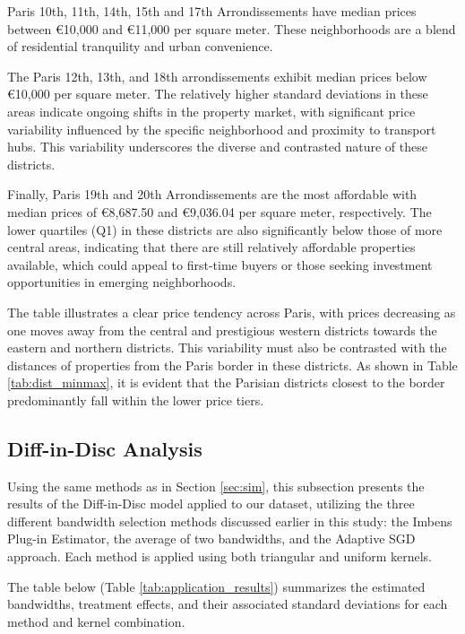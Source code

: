 \documentclass[12pt]{article}
\theoremstyle{plain}
\theoremstyle{remark}
\begin{document}
Paris 10th, 11th, 14th, 15th and 17th Arrondissements have median prices between €10,000 and €11,000 per square meter. These neighborhoods are a blend of residential tranquility and urban convenience.

The Paris 12th, 13th, and 18th arrondissements exhibit median prices below €10,000 per square meter. The relatively higher standard deviations in these areas indicate ongoing shifts in the property market, with significant price variability influenced by the specific neighborhood and proximity to transport hubs. This variability underscores the diverse and contrasted nature of these districts.

Finally, Paris 19th and 20th Arrondissements are the most affordable with median prices of €8,687.50 and €9,036.04 per square meter, respectively. The lower quartiles (Q1) in these districts are also significantly below those of more central areas, indicating that there are still relatively affordable properties available, which could appeal to first-time buyers or those seeking investment opportunities in emerging neighborhoods.

The table illustrates a clear price tendency across Paris, with prices decreasing as one moves away from the central and prestigious western districts towards the eastern and northern districts.
This variability must also be contrasted with the distances of properties from the Paris border in these districts. As shown in Table \ref{tab:dist_minmax}, it is evident that the Parisian districts closest to the border predominantly fall within the lower price tiers.


\subsection{Diff-in-Disc Analysis}

Using the same methods as in Section \ref{sec:sim}, this subsection presents the results of the Diff-in-Disc model applied to our dataset, utilizing the three different bandwidth selection methods discussed earlier in this study: the Imbens Plug-in Estimator, the average of two bandwidths, and the Adaptive SGD approach. Each method is applied using both triangular and uniform kernels.

The table below (Table \ref{tab:application_results}) summarizes the estimated bandwidths, treatment effects, and their associated standard deviations for each method and kernel combination. 
\end{document}
